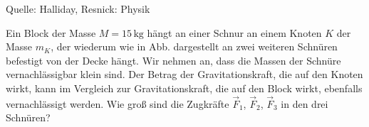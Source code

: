 \begin{MExercises}
\begin{MExercise}
\begin{MSolution}
               \end{MSolution}
               
               Quelle: Halliday, Resnick: Physik
               \end{MExercise}
               
               \begin{MExercise}
               Ein Block der Masse $M=15\, \text{kg}$ h\"angt an einer Schnur an einem Knoten $K$ der Masse $m_K$, der wiederum wie in Abb. dargestellt an zwei weiteren Schn\"uren befestigt von der Decke h\"angt. Wir nehmen an, dass die Massen der Schn\"ure vernachl\"assigbar klein sind. Der Betrag der Gravitationskraft, die auf den Knoten wirkt, kann im Vergleich zur Gravitationskraft, die auf den Block wirkt, ebenfalls vernachl\"assigt werden. Wie gro{\ss} sind die Zugkr\"afte $\vec{F}_1$, $\vec{F}_2$, $\vec{F}_3$ in den drei Schn\"uren?
               
               
               

\end{MExercise}
\end{MExercises}
